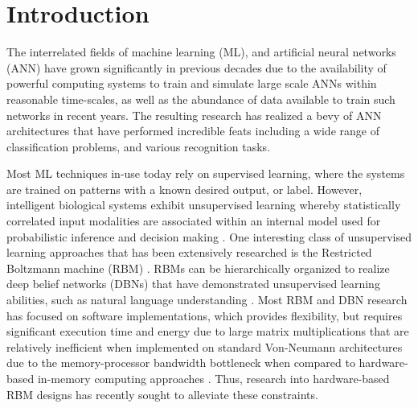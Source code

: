 \section{Introduction}
The interrelated fields of machine learning (ML), and artificial neural networks (ANN) have grown significantly in previous decades due to the availability of powerful computing systems to train and simulate large scale ANNs within reasonable time-scales, as well as the abundance of data available to train such networks in recent years. The resulting research has realized a bevy of ANN architectures that have performed incredible feats including a wide range of classification problems, and various recognition tasks.

Most ML techniques in-use today rely on supervised learning, where the systems are trained on patterns with a known desired output, or label. However, intelligent biological systems exhibit unsupervised learning whereby statistically correlated input modalities are associated within an internal model used for probabilistic inference and decision making \cite{buesing2011}. One interesting class of unsupervised learning approaches that has been extensively researched is the Restricted Boltzmann machine (RBM) \cite{hinton2006}. RBMs can be hierarchically organized to realize deep belief networks (DBNs) that have demonstrated unsupervised learning abilities, such as natural language understanding \cite{Sarikaya2014}. Most RBM and DBN research has focused on software implementations, which provides flexibility, but requires significant execution time and energy due to large matrix multiplications that are relatively inefficient when implemented on standard Von-Neumann architectures due to the memory-processor bandwidth bottleneck when compared to hardware-based in-memory computing approaches \cite{Merolla2014}. Thus, research into hardware-based RBM designs has recently sought to alleviate these constraints. 

